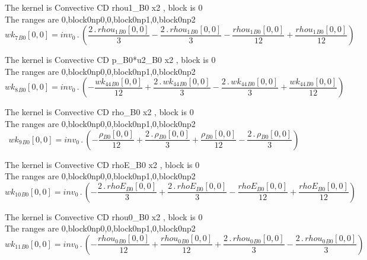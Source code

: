 \documentclass{article}
\begin{document}
\noindent The kernel is Convective CD rhou1_B0 x2 , block is 0\\\noindent The ranges are 0,block0np0,0,block0np1,0,block0np2\\\begin{dmath}{wk_{7}{_{B0}}}[{0,0}] = inv_0 \,.\, \left(\frac{2 \,.\, {rhou_{1}{_{B0}}}[{0,0}]}{3} - \frac{2 \,.\, {rhou_{1}{_{B0}}}[{0,0}]}{3} - \frac{{rhou_{1}{_{B0}}}[{0,0}]}{12} + \frac{{rhou_{1}{_{B0}}}[{0,0}]}{12}\right)\end{dmath}

\noindent The kernel is Convective CD p_B0*u2_B0 x2 , block is 0\\\noindent The ranges are 0,block0np0,0,block0np1,0,block0np2\\\begin{dmath}{wk_{8}{_{B0}}}[{0,0}] = inv_0 \,.\, \left(- \frac{{wk_{44}{_{B0}}}[{0,0}]}{12} + \frac{2 \,.\, {wk_{44}{_{B0}}}[{0,0}]}{3} - \frac{2 \,.\, {wk_{44}{_{B0}}}[{0,0}]}{3} + \frac{{wk_{44}{_{B0}}}[{0,0}]}{12}\right)\end{dmath}

\noindent The kernel is Convective CD rho_B0 x2 , block is 0\\\noindent The ranges are 0,block0np0,0,block0np1,0,block0np2\\\begin{dmath}{wk_{9}{_{B0}}}[{0,0}] = inv_0 \,.\, \left(- \frac{{\rho{_{B0}}}[{0,0}]}{12} + \frac{2 \,.\, {\rho{_{B0}}}[{0,0}]}{3} + \frac{{\rho{_{B0}}}[{0,0}]}{12} - \frac{2 \,.\, {\rho{_{B0}}}[{0,0}]}{3}\right)\end{dmath}

\noindent The kernel is Convective CD rhoE_B0 x2 , block is 0\\\noindent The ranges are 0,block0np0,0,block0np1,0,block0np2\\\begin{dmath}{wk_{10}{_{B0}}}[{0,0}] = inv_0 \,.\, \left(- \frac{2 \,.\, {rhoE{_{B0}}}[{0,0}]}{3} + \frac{2 \,.\, {rhoE{_{B0}}}[{0,0}]}{3} - \frac{{rhoE{_{B0}}}[{0,0}]}{12} + \frac{{rhoE{_{B0}}}[{0,0}]}{12}\right)\end{dmath}

\noindent The kernel is Convective CD rhou0_B0 x2 , block is 0\\\noindent The ranges are 0,block0np0,0,block0np1,0,block0np2\\\begin{dmath}{wk_{11}{_{B0}}}[{0,0}] = inv_0 \,.\, \left(- \frac{{rhou_{0}{_{B0}}}[{0,0}]}{12} + \frac{{rhou_{0}{_{B0}}}[{0,0}]}{12} + \frac{2 \,.\, {rhou_{0}{_{B0}}}[{0,0}]}{3} - \frac{2 \,.\, {rhou_{0}{_{B0}}}[{0,0}]}{3}\right)\end{dmath}
\end{document}
